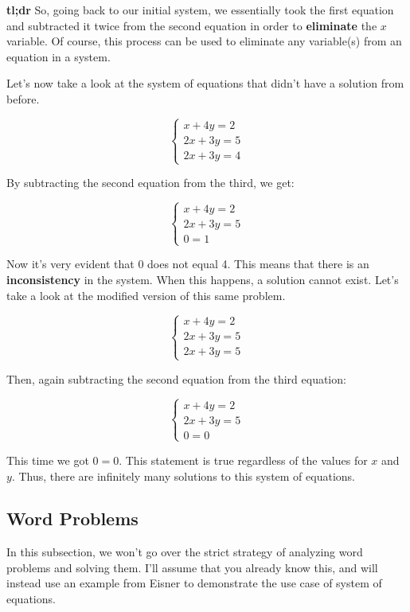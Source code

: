 \documentclass{scrbook}
\theoremstyle{definition}
\begin{document}
\textbf{tl;dr} So, going back to our initial system, we essentially took the first equation and subtracted it twice from the second equation in order to \textbf{eliminate} the $x$ variable. Of course, this process can be used to eliminate any variable(s) from an equation in a system. 

Let's now take a look at the system of equations that didn't have a solution from before.

\[
  \begin{cases}
    x + 4y = 2\\
    2x + 3y = 5\\
    2x + 3y = 4
  \end{cases}
\]

By subtracting the second equation from the third, we get:

\[
  \begin{cases}
    x + 4y = 2\\
    2x + 3y = 5\\
    0 = 1
  \end{cases}
\]

Now it's very evident that 0 does not equal 4. This means that there is an \textbf{inconsistency} in the system. When this happens, a solution cannot exist. Let's take a look at the modified version of this same problem.

\[
  \begin{cases}
    x + 4y = 2\\
    2x + 3y = 5\\
    2x + 3y = 5
  \end{cases}
\]

Then, again subtracting the second equation from the third equation: 

\[
  \begin{cases}
    x + 4y = 2\\
    2x + 3y = 5\\
    0 = 0
  \end{cases}
\]

This time we got $0=0$. This statement is true regardless of the values for $x$ and $y$. Thus, there are infinitely many solutions to this system of equations. 

\subsection{Word Problems}

In this subsection, we won't go over the strict strategy of analyzing word problems and solving them. I'll assume that you already know this, and will instead use an example from Eisner \cite{eisner:1994} to demonstrate the use case of system of equations.
\end{document}
